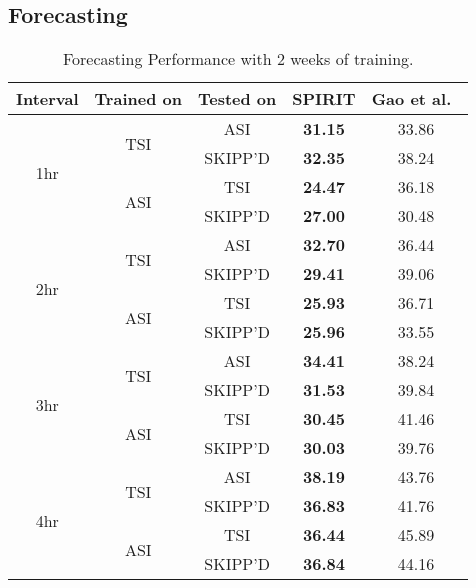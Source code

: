 \subsection{Forecasting}
\label{subsec:appendix_forecasting}
\begin{table}[h]
  \caption{
  Forecasting Performance with 2 weeks of training.
  }
  \label{tab:twoweek_forecast}
  \centering
  \setlength{\tabcolsep}{2pt}
  \renewcommand{\arraystretch}{1.2} 
  \begin{tabular}{c c c c c}
    \hline
    \textbf{Interval} & \textbf{Trained on} & \textbf{Tested on} & \textbf{SPIRIT} & \textbf{Gao et al.~\cite{wacv2022}} \\
    \hline
    \multirow{4}{*}{1hr} & \multirow{2}{*}{TSI} & ASI & \textbf{31.15} & 33.86 \\
                          & & SKIPP'D & \textbf{32.35} & 38.24 \\
                          \cline{2-5}
                          & \multirow{2}{*}{ASI} & TSI & \textbf{24.47} & 36.18 \\
                          & & SKIPP'D & \textbf{27.00} & 30.48 \\
    \hline
    \multirow{4}{*}{2hr} & \multirow{2}{*}{TSI} & ASI & \textbf{32.70} & 36.44 \\
                          & & SKIPP'D & \textbf{29.41} & 39.06 \\
                          \cline{2-5}
                          & \multirow{2}{*}{ASI} & TSI & \textbf{25.93} & 36.71 \\
                          & & SKIPP'D & \textbf{25.96} & 33.55 \\
    \hline
    \multirow{4}{*}{3hr} & \multirow{2}{*}{TSI} & ASI & \textbf{34.41} & 38.24 \\
                          & & SKIPP'D & \textbf{31.53} & 39.84 \\
                          \cline{2-5}
                          & \multirow{2}{*}{ASI} & TSI & \textbf{30.45} & 41.46 \\
                          & & SKIPP'D & \textbf{30.03} & 39.76 \\
    \hline
    \multirow{4}{*}{4hr} & \multirow{2}{*}{TSI} & ASI & \textbf{38.19} & 43.76 \\
                          & & SKIPP'D & \textbf{36.83} & 41.76 \\
                          \cline{2-5}
                          & \multirow{2}{*}{ASI} & TSI & \textbf{36.44} & 45.89 \\
                          & & SKIPP'D & \textbf{36.84} & 44.16 \\
    \hline
  \end{tabular}
\end{table}

